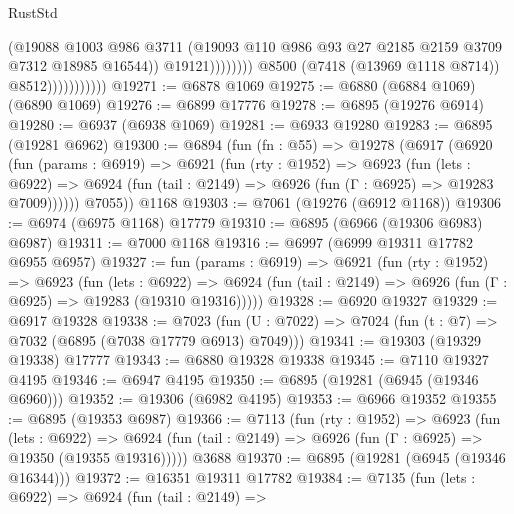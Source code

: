 \begin{lexlean}{RustStd}
\begin{coremodule}
                                          (@19088
                                            @1003
                                            @986
                                            @3711
                                            (@19093
                                              @110
                                              @986
                                              @93
                                              @27
                                              @2185
                                              @2159
                                              @3709
                                              @7312
                                              @18985
                                              @16544))
                                          @19121))))))))
                          @8500
                          (@7418 (@13969 @1118 @8714))
                          @8512)))))))))))
@19271 := @6878 @1069
@19275 := @6880 (@6884 @1069) (@6890 @1069)
@19276 := @6899 @17776
@19278 := @6895 (@19276 @6914)
@19280 := @6937 (@6938 @1069)
@19281 := @6933 @19280
@19283 := @6895 (@19281 @6962)
@19300 := @6894
    (fun (fn : @55) =>
    @19278
      (@6917
        (@6920
          (fun (params : @6919) =>
          @6921
            (fun (rty : @1952) =>
            @6923
              (fun (lets : @6922) =>
              @6924 (fun (tail : @2149) => @6926 (fun (Γ : @6925) => @19283 @7009))))))
        @7055))
    @1168
@19303 := @7061 (@19276 (@6912 @1168))
@19306 := @6974 (@6975 @1168) @17779
@19310 := @6895 (@6966 (@19306 @6983) @6987)
@19311 := @7000 @1168
@19316 := @6997 (@6999 @19311 @17782 @6955 @6957)
@19327 := fun (params : @6919) =>
  @6921
    (fun (rty : @1952) =>
    @6923
      (fun (lets : @6922) =>
      @6924 (fun (tail : @2149) => @6926 (fun (Γ : @6925) => @19283 (@19310 @19316)))))
@19328 := @6920 @19327
@19329 := @6917 @19328
@19338 := @7023
    (fun (U : @7022) => @7024 (fun (t : @7) => @7032 (@6895 (@7038 @17779 @6913) @7049)))
@19341 := @19303 (@19329 @19338) @17777
@19343 := @6880 @19328 @19338
@19345 := @7110 @19327 @4195
@19346 := @6947 @4195
@19350 := @6895 (@19281 (@6945 (@19346 @6960)))
@19352 := @19306 (@6982 @4195)
@19353 := @6966 @19352
@19355 := @6895 (@19353 @6987)
@19366 := @7113
    (fun (rty : @1952) =>
    @6923
      (fun (lets : @6922) =>
      @6924 (fun (tail : @2149) => @6926 (fun (Γ : @6925) => @19350 (@19355 @19316)))))
    @3688
@19370 := @6895 (@19281 (@6945 (@19346 @16344)))
@19372 := @16351 @19311 @17782
@19384 := @7135
    (fun (lets : @6922) =>
    @6924
      (fun (tail : @2149) =>

\end{coremodule}
\end{lexlean}
